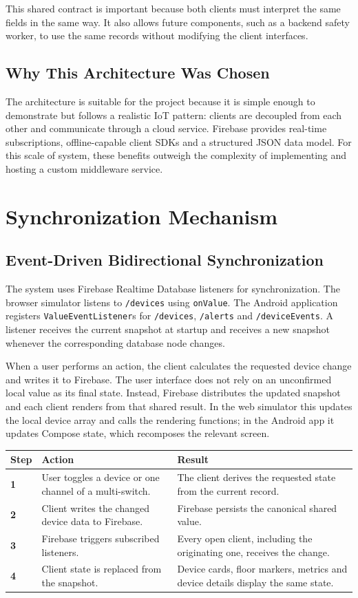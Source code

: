 \documentclass[11pt,a4paper]{article}
\begin{document}
This shared contract is important because both clients must interpret the same fields in the same way. It also allows future components, such as a backend safety worker, to use the same records without modifying the client interfaces.

\subsection{Why This Architecture Was Chosen}
The architecture is suitable for the project because it is simple enough to demonstrate but follows a realistic IoT pattern: clients are decoupled from each other and communicate through a cloud service. Firebase provides real-time subscriptions, offline-capable client SDKs and a structured JSON data model. For this scale of system, these benefits outweigh the complexity of implementing and hosting a custom middleware service.

\newpage
\section{Synchronization Mechanism}
\subsection{Event-Driven Bidirectional Synchronization}
The system uses Firebase Realtime Database listeners for synchronization. The browser simulator listens to \texttt{/devices} using \texttt{onValue}. The Android application registers \texttt{ValueEventListener}s for \texttt{/devices}, \texttt{/alerts} and \texttt{/deviceEvents}. A listener receives the current snapshot at startup and receives a new snapshot whenever the corresponding database node changes.

When a user performs an action, the client calculates the requested device change and writes it to Firebase. The user interface does not rely on an unconfirmed local value as its final state. Instead, Firebase distributes the updated snapshot and each client renders from that shared result. In the web simulator this updates the local device array and calls the rendering functions; in the Android app it updates Compose state, which recomposes the relevant screen.

\begin{tabularx}{\textwidth}{>{\bfseries}p{0.8cm}p{5.0cm}X}
\toprule
Step & Action & Result \\
\midrule
1 & User toggles a device or one channel of a multi-switch. & The client derives the requested state from the current record. \\
2 & Client writes the changed device data to Firebase. & Firebase persists the canonical shared value. \\
3 & Firebase triggers subscribed listeners. & Every open client, including the originating one, receives the change. \\
4 & Client state is replaced from the snapshot. & Device cards, floor markers, metrics and device details display the same state. \\
\bottomrule
\end{tabularx}
\end{document}
